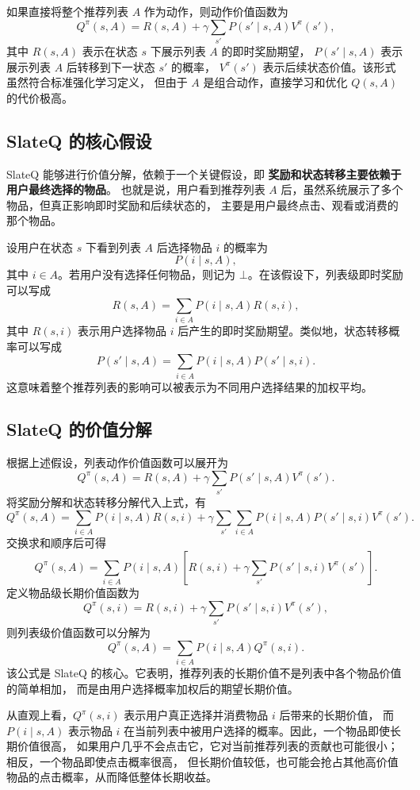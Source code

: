 \documentclass[11pt]{ctexart}
\begin{document}
如果直接将整个推荐列表 $A$ 作为动作，则动作价值函数为
\[
Q^{\pi}(s,A)
=
R(s,A)
+
\gamma
\sum_{s'}P(s'\mid s,A)V^{\pi}(s'),
\]
其中 $R(s,A)$ 表示在状态 $s$ 下展示列表 $A$ 的即时奖励期望，
$P(s'\mid s,A)$ 表示展示列表 $A$ 后转移到下一状态 $s'$ 的概率，
$V^{\pi}(s')$ 表示后续状态价值。该形式虽然符合标准强化学习定义，
但由于 $A$ 是组合动作，直接学习和优化 $Q(s,A)$ 的代价极高。

\subsection{SlateQ 的核心假设}

SlateQ 能够进行价值分解，依赖于一个关键假设，即
\textbf{奖励和状态转移主要依赖于用户最终选择的物品}。
也就是说，用户看到推荐列表 $A$ 后，虽然系统展示了多个物品，但真正影响即时奖励和后续状态的，
主要是用户最终点击、观看或消费的那个物品。

设用户在状态 $s$ 下看到列表 $A$ 后选择物品 $i$ 的概率为
\[
P(i\mid s,A),
\]
其中 $i\in A$。若用户没有选择任何物品，则记为 $\bot$。在该假设下，列表级即时奖励可以写成
\[
R(s,A)
=
\sum_{i\in A}P(i\mid s,A)R(s,i),
\]
其中 $R(s,i)$ 表示用户选择物品 $i$ 后产生的即时奖励期望。类似地，状态转移概率可以写成
\[
P(s'\mid s,A)
=
\sum_{i\in A}P(i\mid s,A)P(s'\mid s,i).
\]
这意味着整个推荐列表的影响可以被表示为不同用户选择结果的加权平均。

\subsection{SlateQ 的价值分解}

根据上述假设，列表动作价值函数可以展开为
\[
Q^{\pi}(s,A)
=
R(s,A)
+
\gamma
\sum_{s'}P(s'\mid s,A)V^{\pi}(s').
\]
将奖励分解和状态转移分解代入上式，有
\[
Q^{\pi}(s,A)
=
\sum_{i\in A}P(i\mid s,A)R(s,i)
+
\gamma
\sum_{s'}
\sum_{i\in A}
P(i\mid s,A)P(s'\mid s,i)V^{\pi}(s').
\]
交换求和顺序后可得
\[
Q^{\pi}(s,A)
=
\sum_{i\in A}
P(i\mid s,A)
\left[
R(s,i)
+
\gamma
\sum_{s'}P(s'\mid s,i)V^{\pi}(s')
\right].
\]
定义物品级长期价值函数为
\[
Q^{\pi}(s,i)
=
R(s,i)
+
\gamma
\sum_{s'}P(s'\mid s,i)V^{\pi}(s'),
\]
则列表级价值函数可以分解为
\[
Q^{\pi}(s,A)
=
\sum_{i\in A}
P(i\mid s,A)Q^{\pi}(s,i).
\]
该公式是 SlateQ 的核心。它表明，推荐列表的长期价值不是列表中各个物品价值的简单相加，
而是由用户选择概率加权后的期望长期价值。

从直观上看，$Q^{\pi}(s,i)$ 表示用户真正选择并消费物品 $i$ 后带来的长期价值，
而 $P(i\mid s,A)$ 表示物品 $i$ 在当前列表中被用户选择的概率。因此，一个物品即使长期价值很高，
如果用户几乎不会点击它，它对当前推荐列表的贡献也可能很小；相反，一个物品即使点击概率很高，
但长期价值较低，也可能会抢占其他高价值物品的点击概率，从而降低整体长期收益。
\end{document}
